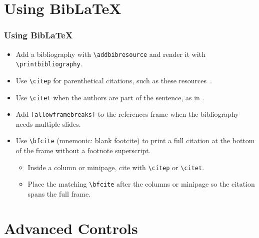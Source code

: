 \documentclass[
	10pt, %
	aspectratio=169, %
]{beamer}
\begin{document}
\section{Using BibLaTeX}
\begin{frame}
	\frametitle{Using BibLaTeX}
	\begin{itemize}
		\item Add a bibliography with \texttt{\textbackslash addbibresource} and render it with \texttt{\textbackslash printbibliography}.
		\item Use \texttt{\textbackslash citep} for parenthetical citations, such as these resources~\citep{anglimAnswerImageFull2010,fiandrinoAnswerDesignCustom2013,kormyloAnswerMakeTikz2017}.
		\item Use \texttt{\textbackslash citet} when the authors are part of the sentence, as in \citet{anglimAnswerImageFull2010}.
		\item Add \texttt{[allowframebreaks]} to the references frame when the bibliography needs multiple slides.
		\item Use \texttt{\textbackslash bfcite} (mnemonic: blank footcite) to print a full citation at the bottom of the frame without a footnote superscript.
		      \begin{itemize}
			      \item Inside a column or minipage, cite with \texttt{\textbackslash citep} or \texttt{\textbackslash citet}.
			      \item Place the matching \texttt{\textbackslash bfcite} after the columns or minipage so the citation spans the full frame.
		      \end{itemize}
	\end{itemize}
\end{frame}

\section{Advanced Controls}
\end{document}
